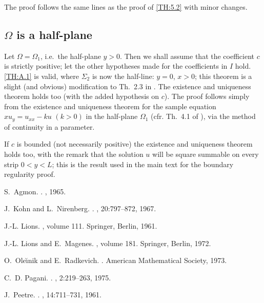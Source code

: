 \documentclass[a4paper,12pt,leqno]{article}
\numberwithin{equation}{section}
\begin{document}
The proof follows the same lines as the proof of \cref{TH:5.2} with minor changes.

\newpage 

\subsection{\texorpdfstring{$\Omega$}{Omega} is a half-plane}

Let $\Omega=\Omega_{1}$, i.e.\ the half-plane $y>0$. Then we shall assume that the coefficient $c$ is strictly positive; let the other hypotheses made for the coefficients in $I$ hold. \cref{TH:A.1} is valid, where $\Sigma_{2}$ is
now the half-line: $y=0$, $x>0$; this theorem is a slight (and obvious) modification to Th.~2.3 in \cite{zbMATH03479447}. The existence and uniqueness theorem holds too (with the added hypothesis on $c$). The proof follows simply from the existence and uniqueness theorem for the sample equation $x u_{y}=u_{x x}-k u$ $(k>0)$ in the half-plane $\Omega_{1}$ (cfr. Th.~4.1 of \cite{zbMATH03479447}), via the method of continuity in a parameter.

If $c$ is bounded (not necessarily positive) the existence and uniqueness theorem holds too, with the remark that the solution $u$ will be square summable on every strip $0<y<L$; this is the result used in the main text for the boundary regularity proof.

\begin{thebibliography}{1}
	S.~{Agmon}.
	.
	, 1965.
	
	J.~{Kohn} and L.~{Nirenberg}.
	.
	, 20:797--872, 1967.
	
	J.-L. {Lions}.
	, volume 111.
	\newblock Springer, Berlin, 1961.
	
	J.-L. {Lions} and E.~{Magenes}.
	,
	volume 181.
	\newblock Springer, Berlin, 1972.
	
	O.~{Ole\u{\i}nik} and E.~{Radkevich}.
	.
	\newblock American Mathematical Society, 1973.
	
	C.~D. {Pagani}.
	.
	, 2:219--263,
	1975.
	
	J.~{Peetre}.
	.
	, 14:711--731, 1961.
\end{thebibliography}
\end{document}
